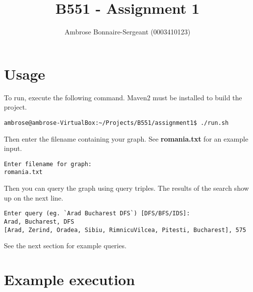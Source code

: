 \documentclass[10pt]{article}
\begin{document}
\title{B551 - Assignment 1}
\author{Ambrose Bonnaire-Sergeant (0003410123)}

\maketitle

\section{Usage}

To run, execute the following command. Maven2 must be installed to build the project.

\begin{verbatim}
ambrose@ambrose-VirtualBox:~/Projects/B551/assignment1$ ./run.sh
\end{verbatim}

Then enter the filename containing your graph. See \textbf{romania.txt} for an example input.

\begin{verbatim}
Enter filename for graph:
romania.txt
\end{verbatim}

Then you can query the graph using query triples. The results of the search show up on the next line.

\begin{verbatim}
Enter query (eg. `Arad Bucharest DFS`) [DFS/BFS/IDS]:
Arad, Bucharest, DFS
[Arad, Zerind, Oradea, Sibiu, RimnicuVilcea, Pitesti, Bucharest], 575
\end{verbatim}

See the next section for example queries.

\section{Example execution}
\end{document}
